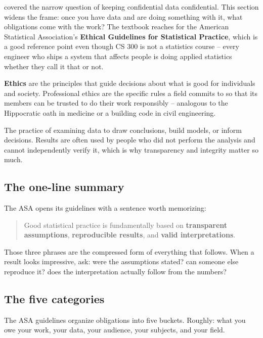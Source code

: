 \documentclass[11pt]{article}
\begin{document}
 covered the narrow question of keeping confidential
data confidential. This section widens the frame: once you have data
and are doing something with it, what obligations come with the work?
The textbook reaches for the American Statistical Association's
\textbf{Ethical Guidelines for Statistical Practice}, which is a good
reference point even though CS 300 is not a statistics course --
every engineer who ships a system that affects people is doing applied
statistics whether they call it that or not.

\begin{defnbox}
\textbf{Ethics} are the principles that guide decisions about what is
good for individuals and society. Professional ethics are the
specific rules a field commits to so that its members can be trusted
to do their work responsibly -- analogous to the Hippocratic oath in
medicine or a building code in civil engineering.
\end{defnbox}

\begin{defnbox}
The practice of examining data to draw conclusions, build models, or
inform decisions. Results are often used by people who did not
perform the analysis and cannot independently verify it, which is
why transparency and integrity matter so much.
\end{defnbox}

\subsection{The one-line summary}

The ASA opens its guidelines with a sentence worth memorizing:
\begin{quote}
Good statistical practice is fundamentally based on \textbf{transparent
assumptions}, \textbf{reproducible results}, and \textbf{valid
interpretations}.
\end{quote}

Those three phrases are the compressed form of everything that
follows. When a result looks impressive, ask: were the assumptions
stated? can someone else reproduce it? does the interpretation
actually follow from the numbers?

\subsection{The five categories}

The ASA guidelines organize obligations into five buckets. Roughly:
what you owe your work, your data, your audience, your subjects, and
your field.
\end{document}
